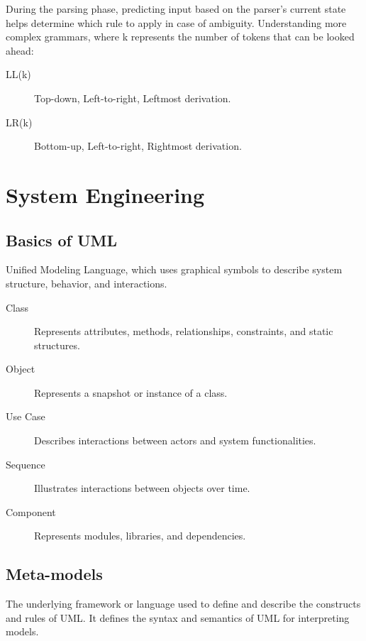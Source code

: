 \documentclass[11pt,journal,compsoc]{IEEEtran}
\begin{document}
During the parsing phase, predicting input based on the parser's current state helps determine which rule to apply in case of ambiguity. Understanding more complex grammars, where k represents the number of tokens that can be looked ahead:

\begin{description}
    \item[LL(k)] Top-down, Left-to-right, Leftmost derivation.
    
    \item[LR(k)] Bottom-up, Left-to-right, Rightmost derivation.
\end{description}


\section{System Engineering}


\subsection{Basics of UML}

Unified Modeling Language, which uses graphical symbols to describe system structure, behavior, and interactions.

\begin{description}
    \item[Class] Represents attributes, methods, relationships, constraints, and static structures.
    
    \item[Object] Represents a snapshot or instance of a class.

    \item[Use Case] Describes interactions between actors and system functionalities.

    \item[Sequence] Illustrates interactions between objects over time.

    \item[Component] Represents modules, libraries, and dependencies.
\end{description}


\subsection{Meta-models}

The underlying framework or language used to define and describe the constructs and rules of UML. It defines the syntax and semantics of UML for interpreting models.
\end{document}
